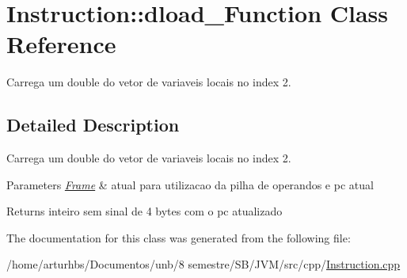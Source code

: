 \hypertarget{classInstruction_1_1dload__2Function}{}\section{Instruction\+:\+:dload\+\_\+Function Class Reference}
\label{classInstruction_1_1dload__2Function}


Carrega um double do vetor de variaveis locais no index 2.  




\subsection{Detailed Description}
Carrega um double do vetor de variaveis locais no index 2. 


\begin{DoxyParams}{Parameters}
{\em \hyperlink{classFrame}{Frame}} & atual para utilizacao da pilha de operandos e pc atual \\
\hline
\end{DoxyParams}
\begin{DoxyReturn}{Returns}
inteiro sem sinal de 4 bytes com o pc atualizado 
\end{DoxyReturn}


The documentation for this class was generated from the following file\+:\begin{DoxyCompactItemize}
\item 
/home/arturhbs/\+Documentos/unb/8 semestre/\+S\+B/\+J\+V\+M/src/cpp/\hyperlink{Instruction_8cpp}{Instruction.\+cpp}\end{DoxyCompactItemize}
